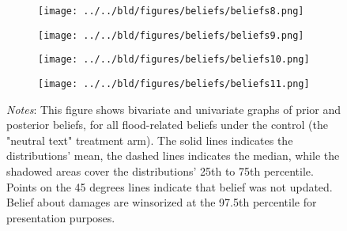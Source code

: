 \begin{figure}[H]
\centering
\caption{Belief updating under control}
\begin{subfigure}[b]{\linewidth}
\centering
\texttt{[image: ../../bld/figures/beliefs/beliefs8.png]}
\label{fig:risk-control}
\end{subfigure}
\hfill
\begin{subfigure}[b]{\linewidth}
\centering
\texttt{[image: ../../bld/figures/beliefs/beliefs9.png]}
\label{fig:damages-control}
\end{subfigure}
\hfill
\begin{subfigure}[b]{\linewidth}
\centering
\texttt{[image: ../../bld/figures/beliefs/beliefs10.png]}
\label{fig:comptot-control}
\end{subfigure}
\hfill
\begin{subfigure}[b]{\linewidth}
\centering
\texttt{[image: ../../bld/figures/beliefs/beliefs11.png]}
\label{fig:compshare-control}
\end{subfigure}
\label{fig:updating_active}  
\justifying
\footnotesize \textit{Notes}: This figure shows bivariate and univariate graphs of prior and posterior beliefs, for all flood-related beliefs under the control (the "neutral text" treatment arm). The solid lines indicates the distributions' mean, the dashed lines indicates the median, while the shadowed areas cover the distributions' 25th to 75th percentile. Points on the 45 degrees lines indicate that belief was not updated. Belief about damages are winsorized at the 97.5th percentile for presentation purposes.
\end{figure}








